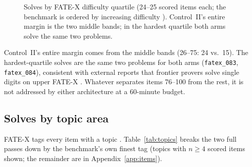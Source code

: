 \documentclass[12pt, a4paper]{article}
\newcommand{\run}[1]{\texttt{#1}}
\begin{document}
\begin{figure}[H]
\centering
{}
\caption{Solves by FATE-X difficulty quartile (24--25 scored items each; the
benchmark is ordered by increasing difficulty \cite{fatex2025}). Control~II's
entire margin is the two middle bands; in the hardest quartile both arms solve
the same two problems.}
\label{fig:bands}
\end{figure}

Control~II's entire margin comes from the middle bands (26--75: 24 vs.\ 15).
The hardest-quartile solves are the same two problems for both arms
(\run{fatex\_083}, \run{fatex\_084}), consistent with external reports that
frontier provers solve single digits on upper FATE-X
\cite{benchmarklist_fatex}. Whatever separates items 76--100 from the rest, it
is not addressed by either architecture at a 60-minute budget.

\subsection{Solves by topic area}
\label{sec:topics}

FATE-X tags every item with a topic \cite{fatex2025}. Table~\ref{tab:topics}
breaks the two full passes down by the benchmark's own finest tag (topics with
$n\ge4$ scored items shown; the remainder are in
Appendix~\ref{app:items}).
\end{document}

